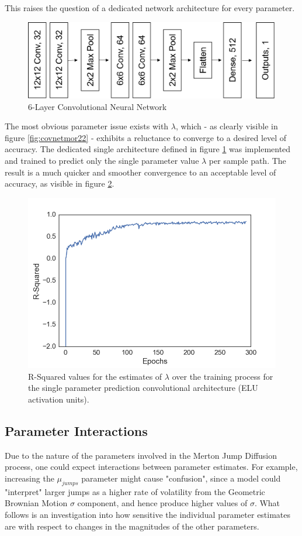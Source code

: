 \documentclass[11pt,oneside,openany,a4paper,english, report, goldenblock
]{usthesis}
\begin{document}
This raises the question of a dedicated network architecture for every parameter.

\begin{figure}[h]
	\centering
	\includegraphics[width=0.54\linewidth]{SingleParameterDedicatedCNN}
	\caption[Dedicated Single Parameter Prediction CNN]{6-Layer Convolutional Neural Network}
	\label{fig:singleparameterdedicatedcnn}
\end{figure}

The most obvious parameter issue exists with $\lambda$, which - as clearly visible in figure \ref{fig:covnetmor22} - exhibits a reluctance to converge to a desired level of accuracy. The dedicated single architecture defined in figure \ref{fig:singleparameterdedicatedcnn} was implemented and trained to predict only the single parameter value $\lambda$ per sample path. The result is a much quicker and smoother convergence to an acceptable level of accuracy, as visible in figure \ref{fig:lambda-rsquared}.

\begin{figure}[h]
	\centering
	\includegraphics[width=0.7\linewidth]{Images/Prediction-Convergence/ConvolutionalNN-SingleOutput/Lambda-RSquared}
	\caption[R-Squared values for the predictions of $\lambda$ over the training process for the single parameter prediction convolutional architecture (ELU activation units).]{R-Squared values for the estimates of $\lambda$ over the training process for the single parameter prediction convolutional architecture (ELU activation units).}
	\label{fig:lambda-rsquared}
\end{figure}

\subsection{Parameter Interactions}
Due to the nature of the parameters involved in the Merton Jump Diffusion process, one could expect interactions between parameter estimates. For example, increasing the $\mu_{jumps}$ parameter might cause "confusion", since a model could "interpret" larger jumps as a higher rate of volatility from the Geometric Brownian Motion $\sigma$ component, and hence produce higher values of $\sigma$. What follows is an investigation into how sensitive the individual parameter estimates are with respect to changes in the magnitudes of the other parameters. 
\end{document}
